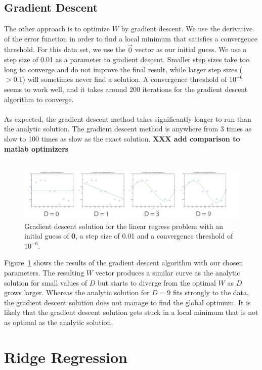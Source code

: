 \documentclass[11pt]{article}   %
\theoremstyle{plain}
\begin{document}
\subsection{Gradient Descent}
The other approach is to optimize $W$ by gradient descent. We use the derivative of the error function in order to find a local minimum that satisfies a convergence threshold. For this data set, we use the \textbf{$\overrightarrow{0}$} vector as our initial guess. We use a step size of 0.01 as a parameter to gradient descent. Smaller step sizes take too long to converge and do not improve the final result, while larger step sizes ($> 0.1$) will sometimes never find a solution. A convergence threshold of $10^{-6}$ seems to work well, and it takes around $200$ iterations for the gradient descent algorithm to converge. \\
\\
\indent As expected, the gradient descent method takes significantly longer to run than the analytic solution. The gradient descent method is anywhere from 3 times as slow to 100 times as slow as the exact solution. \textbf{XXX add comparison to matlab optimizers} \\
\\
\begin{figure}[h!]\label{fig-gradient}
  \caption{Gradient descent solution for the linear regress problem with an initial guess of \textbf{0}, a step size of 0.01 and a convergence threshold of $10^{-6}$.}
  \centering
    \includegraphics[width=1.0\textwidth]{figures/problem_2_2_full.png}
\end{figure}

\indent Figure~\ref{fig-gradient} shows the results of the gradient descent algorithm with our chosen parameters. The resulting $W$ vector produces a similar curve as the analytic solution for small values of $D$ but starts to diverge from the optimal $W$ as $D$ grows larger. Whereas the analytic solution for $D=9$ fits strongly to the data, the gradient descent solution does not manage to find the global optimum. It is likely that the gradient descent solution gets stuck in a local minimum that is not as optimal as the analytic solution.

\section{Ridge Regression}\label{sec-ridge}
\end{document}
